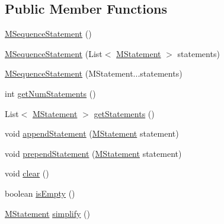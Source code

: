 \subsection*{Public Member Functions}
\begin{DoxyCompactItemize}
\item 
\hyperlink{classorg_1_1tzi_1_1use_1_1uml_1_1sys_1_1soil_1_1_m_sequence_statement_abc67ca4ca28ae455138bb83ff1953631}{M\-Sequence\-Statement} ()
\item 
\hyperlink{classorg_1_1tzi_1_1use_1_1uml_1_1sys_1_1soil_1_1_m_sequence_statement_a73c7d2df1105a6769987b841d722bc69}{M\-Sequence\-Statement} (List$<$ \hyperlink{classorg_1_1tzi_1_1use_1_1uml_1_1sys_1_1soil_1_1_m_statement}{M\-Statement} $>$ statements)
\item 
\hyperlink{classorg_1_1tzi_1_1use_1_1uml_1_1sys_1_1soil_1_1_m_sequence_statement_af58963ca24428cbbf80aa3ec6febb322}{M\-Sequence\-Statement} (M\-Statement...\-statements)
\item 
int \hyperlink{classorg_1_1tzi_1_1use_1_1uml_1_1sys_1_1soil_1_1_m_sequence_statement_a347593786defd33b457f4a0adb0b8c4a}{get\-Num\-Statements} ()
\item 
List$<$ \hyperlink{classorg_1_1tzi_1_1use_1_1uml_1_1sys_1_1soil_1_1_m_statement}{M\-Statement} $>$ \hyperlink{classorg_1_1tzi_1_1use_1_1uml_1_1sys_1_1soil_1_1_m_sequence_statement_af7ea83b7138ff7015e1f856dc00a5df7}{get\-Statements} ()
\item 
void \hyperlink{classorg_1_1tzi_1_1use_1_1uml_1_1sys_1_1soil_1_1_m_sequence_statement_a6db6d6cb710a3036b829ae201ba78536}{append\-Statement} (\hyperlink{classorg_1_1tzi_1_1use_1_1uml_1_1sys_1_1soil_1_1_m_statement}{M\-Statement} statement)
\item 
void \hyperlink{classorg_1_1tzi_1_1use_1_1uml_1_1sys_1_1soil_1_1_m_sequence_statement_aac554377f7a9762dd749499eac22eb3f}{prepend\-Statement} (\hyperlink{classorg_1_1tzi_1_1use_1_1uml_1_1sys_1_1soil_1_1_m_statement}{M\-Statement} statement)
\item 
void \hyperlink{classorg_1_1tzi_1_1use_1_1uml_1_1sys_1_1soil_1_1_m_sequence_statement_aabf8609073d440fa9d7920e49ad182af}{clear} ()
\item 
boolean \hyperlink{classorg_1_1tzi_1_1use_1_1uml_1_1sys_1_1soil_1_1_m_sequence_statement_acbaea58f230d334db0d6d8dd4cf2bc2b}{is\-Empty} ()
\item 
\hyperlink{classorg_1_1tzi_1_1use_1_1uml_1_1sys_1_1soil_1_1_m_statement}{M\-Statement} \hyperlink{classorg_1_1tzi_1_1use_1_1uml_1_1sys_1_1soil_1_1_m_sequence_statement_a1735d5367051c620a7dd060751a35ec4}{simplify} ()

\end{DoxyCompactItemize}
